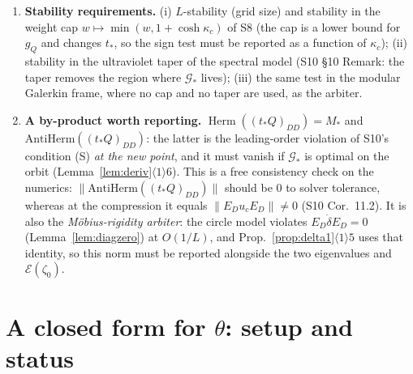 \documentclass[11pt]{article}
\newcommand{\Herm}{\operatorname{Herm}}
\begin{document}
\begin{enumerate}[leftmargin=1.8em,itemsep=2pt]
 $1-\theta=0.616\pm0.003$ (Prop.~\ref{prop:bdryfun}(4)) --- the numerics must reproduce it;
 (ii) the ``cell'' form of \eqref{eq:Ebdry}: the diagonal entry of $M_*$ on the first cell
 at $y=0$ (resp.\ the last cell, $y=Y_{\max}$), suitably normalised by the cell width, must
 have the same sign as $\mathcal E(\zeta_0)$ (resp.\ $\mathcal E(\zeta_\infty)$).  Report
 the $h$- and $Y_{\max}$-dependence, and report the \emph{corner term} separately from the
 total: by \eqref{eq:T5decomp} the total carries a scheme-dependent $O(h)$ viscosity piece,
 and only the corner term represents the continuum value.  This tests (e) on the model cone
 only; the non-vector-field generators of Remark~\ref{rem:H3} are not reached by any of
 these directions, and excluding them is exactly the content of H3
 (Remark~\ref{rem:H3space}).
\item \textbf{Stability requirements.}  (i) $L$-stability (grid size) and stability in the
 weight cap $w\mapsto\min(w,1+\cosh\kappa_c)$ of S8 (the cap is a lower bound for $g_Q$ and
 changes $t_*$, so the sign test must be reported as a function of $\kappa_c$);
 (ii) stability in the ultraviolet taper of the spectral model (S10 \S10 Remark: the taper
 removes the region where $\mathcal G_*$ lives); (iii) the same test in the modular
 Galerkin frame, where no cap and no taper are used, as the arbiter.
\item \textbf{A by-product worth reporting.}  $\Herm((t_*Q)_{DD})=M_*$ and
 $\mathrm{AntiHerm}((t_*Q)_{DD})$: the latter is the leading-order violation of S10's
 condition {\rm(S)} \emph{at the new point}, and it must vanish if $\mathcal G_*$ is
 optimal on the orbit (Lemma~\ref{lem:deriv}$\langle1\rangle6$).  This is a free
 consistency check on the numerics: $\|\mathrm{AntiHerm}((t_*Q)_{DD})\|$ should be
 $0$ to solver tolerance, whereas at the compression it equals
 $\|E_Du_cE_D\|\ne0$ (S10 Cor.~11.2).  It is also the \emph{M\"obius-rigidity arbiter}:
 the circle model violates $E_D\dot\delta E_D=0$ (Lemma~\ref{lem:diagzero}) at $O(1/L)$, and
 Prop.~\ref{prop:delta1}$\langle1\rangle5$ uses that identity, so this norm must be reported
 alongside the two eigenvalues and $\mathcal E(\zeta_0)$.
\end{enumerate}

\section{A closed form for \texorpdfstring{$\theta$}{theta}: setup and status}\label{sec:theta}
\end{document}
